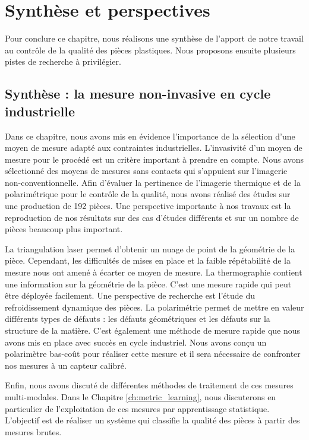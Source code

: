 \newpage


\section{Synthèse et perspectives}  \label{sec:measure_perspective}
Pour conclure ce chapitre, nous réalisons une synthèse de l'apport de notre travail au contrôle de la qualité des pièces plastiques.
Nous proposons ensuite plusieurs pistes de recherche à privilégier.

\subsection{Synthèse : la mesure non-invasive en cycle industrielle}
Dans ce chapitre, nous avons mis en évidence l'importance de la sélection d'une moyen de mesure adapté aux contraintes industrielles.
L'invasivité d'un moyen de mesure pour le procédé est un critère important à prendre en compte.
Nous avons sélectionné des moyens de mesures sans contacts qui s'appuient sur l'imagerie non-conventionnelle.
Afin d'évaluer la pertinence de l'imagerie thermique et de la polarimétrique pour le contrôle de la qualité, nous avons réalisé des études sur une production de 192 pièces.
Une perspective importante à nos travaux est la reproduction de nos résultats sur des cas d'études différents et sur un nombre de pièces beaucoup plus important.

La triangulation laser permet d'obtenir un nuage de point de la géométrie de la pièce.
Cependant, les difficultés de mises en place et la faible répétabilité de la mesure nous ont amené à écarter ce moyen de mesure.
La thermographie contient une information sur la géométrie de la pièce.
C'est une mesure rapide qui peut être déployée facilement.
Une perspective de recherche est l'étude du refroidissement dynamique des pièces. 
La polarimétrie permet de mettre en valeur différents types de défauts : les défauts géométriques et les défauts sur la structure de la matière.
C'est également une méthode de mesure rapide que nous avons mis en place avec succès en cycle industriel.
Nous avons conçu un polarimètre bas-coût pour réaliser cette mesure et il sera nécessaire de confronter nos mesures à un capteur calibré.

Enfin, nous avons discuté de différentes méthodes de traitement de ces mesures multi-modales.
Dans le Chapitre \ref{ch:metric_learning}, nous discuterons en particulier de l'exploitation de ces mesures par apprentissage statistique.
L'objectif est de réaliser un système qui classifie la qualité des pièces à partir des mesures brutes.

